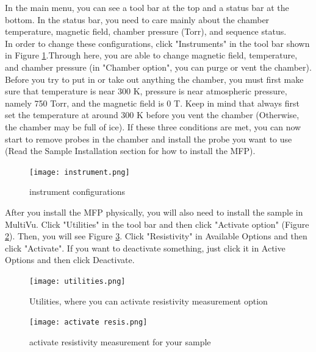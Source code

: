 \documentclass{article}
\begin{document}
        In the main menu, you can see a tool bar at the top and a status bar at the bottom. In the status bar, you need to care mainly about the chamber temperature, magnetic field, chamber pressure (Torr), and sequence status. \\
        In order to change these configurations, click "Instruments" in the tool bar shown in Figure \ref{instrument}.Through here, you are able to change magnetic field, temperature, and chamber pressure (in "Chamber option", you can purge or vent the chamber).\\
        Before you try to put in or take out anything the chamber, you must first make sure that temperature is near 300 K, pressure is near atmospheric pressure, namely 750 Torr, and the magnetic field is 0 T. Keep in mind that always first set the temperature at around 300 K before you vent the chamber (Otherwise, the chamber may be full of ice). If these three conditions are met, you can now start to remove probes in the chamber and install the probe you want to use (Read the Sample Installation section for how to install the MFP).\\
        
        \begin{figure}[H]
            \centering
            \texttt{[image: instrument.png]}
            \caption{instrument configurations}
            \label{instrument}
        \end{figure}

        After you install the MFP physically, you will also need to install the sample in MultiVu. Click "Utilities" in the tool bar and then click "Activate option" (Figure \ref{utilities}). Then, you will see Figure \ref{activate}. Click "Resistivity" in Available Options and then click "Activate". If you want to deactivate something, just click it in Active Options and then click Deactivate.

        \begin{figure}[H]
            \centering
            \texttt{[image: utilities.png]}
            \caption{Utilities, where you can activate resistivity measurement option}
            \label{utilities}
        \end{figure}

        \begin{figure}[H]
            \centering
            \texttt{[image: activate resis.png]}
            \caption{activate resistivity measurement for your sample}
            \label{activate}
        \end{figure}
\end{document}
